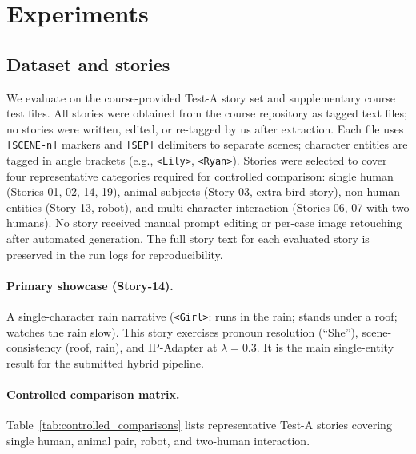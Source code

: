 \section{Experiments}
\label{sec:exp}

\subsection{Dataset and stories}
We evaluate on the course-provided Test-A story set and supplementary course test files. All stories were obtained from the course repository as tagged text files; no stories were written, edited, or re-tagged by us after extraction. Each file uses \texttt{[SCENE-n]} markers and \texttt{[SEP]} delimiters to separate scenes; character entities are tagged in angle brackets (e.g., \texttt{<Lily>}, \texttt{<Ryan>}). Stories were selected to cover four representative categories required for controlled comparison: single human (Stories 01, 02, 14, 19), animal subjects (Story 03, extra bird story), non-human entities (Story 13, robot), and multi-character interaction (Stories 06, 07 with two humans). No story received manual prompt editing or per-case image retouching after automated generation. The full story text for each evaluated story is preserved in the run logs for reproducibility.

\paragraph{Primary showcase (Story-14).}
A single-character rain narrative (\texttt{<Girl>}: runs in the rain; stands under a roof; watches the rain slow).
This story exercises pronoun resolution (``She''), scene-consistency (roof, rain), and IP-Adapter at $\lambda=0.3$.
It is the main single-entity result for the submitted hybrid pipeline.

\paragraph{Controlled comparison matrix.}
Table~\ref{tab:controlled_comparisons} lists representative Test-A stories covering single human, animal pair, robot, and two-human interaction.

